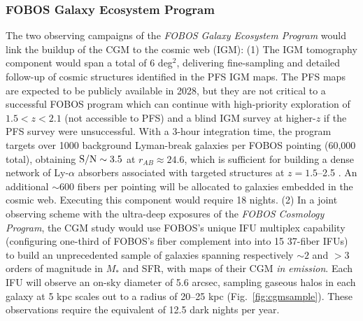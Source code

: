 \documentclass[11pt,a4paper,twoside,onecolumn,openany,final,oldfontcommands]{memoir}
\begin{document}


\subsubsection{FOBOS Galaxy Ecosystem Program}

The two observing campaigns of the \textit{FOBOS Galaxy Ecosystem Program} would link the buildup of the CGM to the cosmic web (IGM): (1) The IGM tomography component would span a total of 6 deg$^2$, delivering fine-sampling and detailed follow-up of cosmic structures identified in the PFS IGM maps.  The PFS maps are expected to be publicly available in 2028, but they are not critical to a successful FOBOS program which can continue with high-priority exploration of $1.5 < z < 2.1$ (not accessible to PFS) and a blind IGM survey at higher-$z$ if the PFS survey were unsuccessful.  With a 3-hour integration time, the program targets over 1000 background Lyman-break galaxies per FOBOS pointing (60,000 total), obtaining ${\rm S/N} \sim 3.5$ at $r_{AB} \approx 24.6$, which is sufficient for building a dense network of Ly-$\alpha$ absorbers associated with targeted structures at $z = 1.5$--2.5 \citep[see][]{lee16}. An additional $\sim$600 fibers per pointing will be allocated to galaxies embedded in the cosmic web. Executing this component would require 18 nights.  (2) In a joint observing scheme with the ultra-deep exposures of the \textit{FOBOS Cosmology Program}, the CGM study would use FOBOS's unique IFU multiplex capability (configuring one-third of FOBOS's fiber complement into into 15 37-fiber IFUs) to build an unprecedented sample of galaxies spanning respectively $\sim2$ and $>3$ orders of magnitude in $M_\ast$ and SFR, with maps of their CGM \textit{in emission}.  Each IFU will observe an on-sky diameter of 5.6 arcsec, sampling gaseous halos in each galaxy at 5 kpc scales out to a radius of 20--25 kpc (Fig.~\ref{fig:cgmsample}).  These observations require the equivalent of 12.5 dark nights per year.

\end{document}
